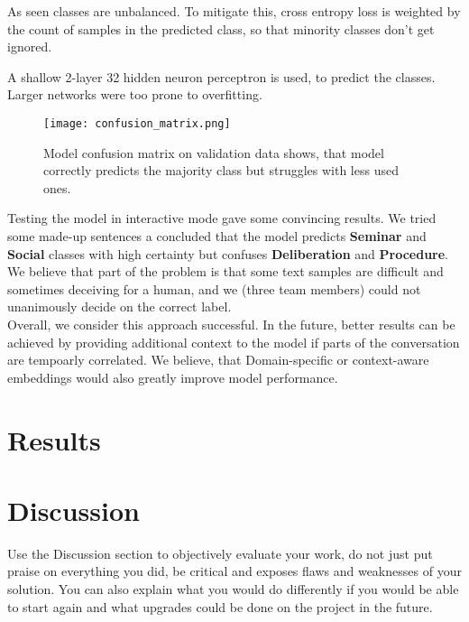\documentclass[fleqn,moreauthors,10pt]{ds_report}
\begin{document}
As seen classes are unbalanced. To mitigate this, cross entropy loss is weighted by the count of samples in the predicted class, so that minority classes don't get ignored.

A shallow 2-layer 32 hidden neuron perceptron is used, to predict the classes. Larger networks were too prone to overfitting.

\begin{figure}[!htb]
    \centering
    \texttt{[image: confusion\_matrix.png]}
    \caption{Model confusion matrix on validation data shows, that model correctly predicts the majority class but struggles with less used ones.}
    \label{fig:conf_matrix_model}
\end{figure}

Testing the model in interactive mode gave some convincing results. We tried some made-up sentences a concluded that the model predicts \textbf{Seminar} and \textbf{Social} classes with high certainty but confuses \textbf{Deliberation} and \textbf{Procedure}. \\
We believe that part of the problem is that some text samples are difficult and sometimes deceiving for a human, and we (three team members) could not unanimously decide on the correct label. \\

Overall, we consider this approach successful. In the future, better results can be achieved by providing additional context to the model if parts of the conversation are tempoarly correlated. We believe, that Domain-specific or context-aware embeddings would also greatly improve model performance. 


\section*{Results}











\section*{Discussion}

Use the Discussion section to objectively evaluate your work, do not just put praise on everything you did, be critical and exposes flaws and weaknesses of your solution. You can also explain what you would do differently if you would be able to start again and what upgrades could be done on the project in the future.







\end{document}
